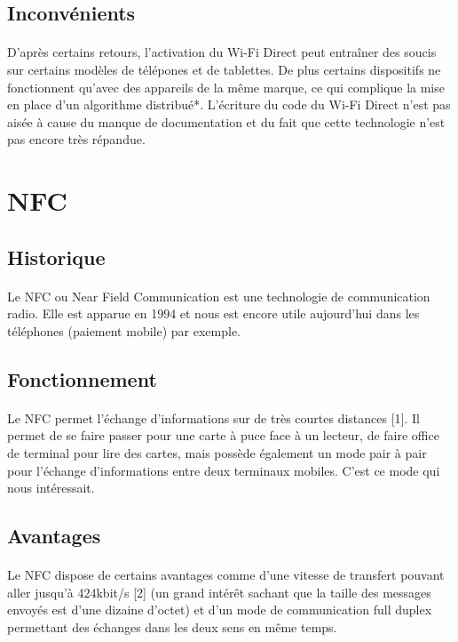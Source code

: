 \documentclass[a4paper,10pt]{report}
\begin{document}
    \subsection{Inconvénients}
    \paragraph{}
    D'après certains retours, l'activation du Wi-Fi Direct peut entraîner des soucis sur certains modèles de télépones et de tablettes. De plus certains dispositifs ne fonctionnent qu'avec des appareils de la même marque, ce qui complique la mise en place d'un algorithme distribué*.
    L'écriture du code du Wi-Fi Direct n'est pas aisée à cause du manque de documentation et du fait que cette technologie n'est pas encore très répandue.
  \section{NFC}
    \subsection{Historique}
     \paragraph{}
     Le NFC ou Near Field Communication est une technologie de communication radio. Elle est apparue en 1994 et nous est encore utile aujourd'hui dans les téléphones (paiement mobile) par exemple.
    \subsection{Fonctionnement}
     \paragraph{}
     Le NFC permet l'échange d'informations sur de très courtes distances [1]. Il permet de se faire passer pour une carte à puce face à un lecteur, de faire office de terminal pour lire des cartes, mais possède également un mode pair à pair pour l'échange d'informations entre deux terminaux mobiles. C'est ce mode qui nous intéressait.
    \subsection{Avantages}
    \paragraph{}
    Le NFC dispose de certains avantages comme d'une vitesse de transfert pouvant aller jusqu'à 424kbit/s [2] (un grand intérêt sachant que la taille des messages envoyés est d'une dizaine d'octet) et d'un mode de communication full duplex permettant des échanges dans les deux sens en même temps.
\end{document}
